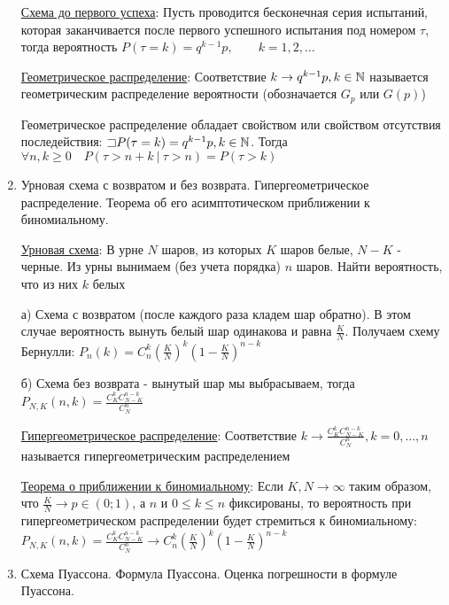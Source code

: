 \documentclass[12pt]{article}
\begin{document}
\begin{enumerate}
    \hyperlink{untilfirstsuccessschema}{Схема до первого успеха}: Пусть проводится бесконечная серия испытаний, которая заканчивается после первого успешного испытания
    под номером $\tau$, тогда вероятность $P(\tau = k) = q^{k - 1} p, \quad\quad k = 1, 2, \dots$

    \hyperlink{geometricdistribution}{Геометрическое распределение}: Соответствие $k \rightarrow q^{k - 1} p, k \in \mathbb{N}$ называется геометрическим
    распределение вероятности (обозначается $G_p$ или $G(p)$)

    Геометрическое распределение обладает свойством  или свойством отсутствия
    последействия: \Ths $\mathord{\sqsupset} P(\tau = k) = q^{k - 1} p, k \in \mathbb{N}$. Тогда $\forall n, k \geq 0 \quad P(\tau > n + k \ | \ \tau > n) = P(\tau > k)$

    \item Урновая схема с возвратом и без возврата. Гипергеометрическое распределение. Теорема об его асимптотическом приближении к биномиальному.

    \hyperlink{urnschema}{Урновая схема}: В урне $N$ шаров, из которых $K$ шаров белые, $N - K$ - черные.
    Из урны вынимаем (без учета порядка) $n$ шаров. Найти вероятность, что из них $k$ белых

    а) Схема с возвратом (после каждого раза кладем шар обратно). В этом случае вероятность вынуть белый шар одинакова и
    равна $\frac{K}{N}$. Получаем схему Бернулли: $P_n(k) = C^k_n \left(\frac{K}{N}\right)^k \left(1 - \frac{K}{N}\right)^{n - k}$

    б) Схема без возврата - вынутый шар мы выбрасываем, тогда
    $P_{N, K} (n, k) = \frac{C^k_K C^{n - k}_{N - K}}{C^n_N}$

    \hyperlink{hypergeometricdistribution}{Гипергеометрическое распределение}: Соответствие $k \rightarrow \frac{C^k_K C^{n - k}_{N - K}}{C^n_N}, k = 0, \dots, n$ называется гипергеометрическим
    распределением

    \hyperlink{hypergeometricasimptotic}{Теорема о приближении к биномиальному}: \Ths Если $K, N \to \infty$ таким образом, что $\frac{K}{N} \to p \in (0;1)$, а $n$ и $0 \leq k \leq n$ фиксированы, то
    вероятность при гипергеометрическом распределении будет стремиться к биномиальному:
    $P_{N,K} (n, k) = \frac{C^k_K C^{n - k}_{N - K}}{C^n_N} \rightarrow C^k_n \left(\frac{K}{N}\right)^k \left(1 - \frac{K}{N}\right)^{n - k}$

    \item Схема Пуассона. Формула Пуассона. Оценка погрешности в формуле Пуассона.
    

\end{enumerate}
\end{document}
